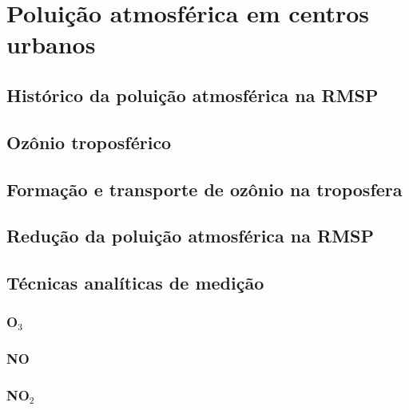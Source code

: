 \chapter{Poluição atmosférica em centros urbanos}

\lipsum[21-22]

\section{Histórico da poluição atmosférica na RMSP}

\lipsum[21-22]

\section{Ozônio troposférico}

\lipsum[24-25]

\section{Formação e transporte de ozônio na troposfera}

\lipsum[24-25]

\section{Redução da poluição atmosférica na RMSP}

\lipsum[24-25]

\section{Técnicas analíticas de medição}

\subsection{O$_{3}$}

\lipsum[24-25]

\subsection{NO}

\lipsum[24-25]

\subsection{NO$_{2}$}

\lipsum[24-25]